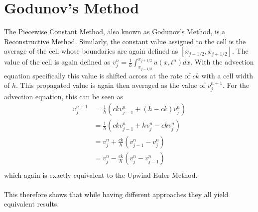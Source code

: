 \section{Godunov's Method}
The Piecewise Constant Method, also known as Godunov's Method, is a Reconstructive Method. Similarly, the constant value assigned to the cell is the average of the cell whose boundaries are again defined as $[x_{j-1/2},x_{j+1/2}]$. The value of the cell is again defined as $v^n_j=\frac{1}{h}\int_{x_{j-1/2}}^{x_{j+1/2}}u(x,t^n)dx$. With the advection equation specifically this value is shifted across at the rate of $ck$ with a cell width of $h$. This propagated value is again then averaged as the value of $v^{n+1}_j$. For the advection equation, this can be seen as
\begin{align*}
  v^{n+1}_j &= \frac{1}{h}(ckv^n_{j-1} + (h-ck)v^n_j) \\
            &= \frac{1}{h}(ckv^n_{j-1} + hv^n_j - ckv^n_j) \\
            &= v^n_j + \frac{ck}{h}(v^n_{j-1} - v^n_j) \\
            &= v^n_j - \frac{ck}{h}(v^n_j - v^n_{j-1}) \\
\end{align*}
which again is exactly equivalent to the Upwind Euler Method.
\\
\\
This therefore shows that while having different approaches they all yield equivalent results. 